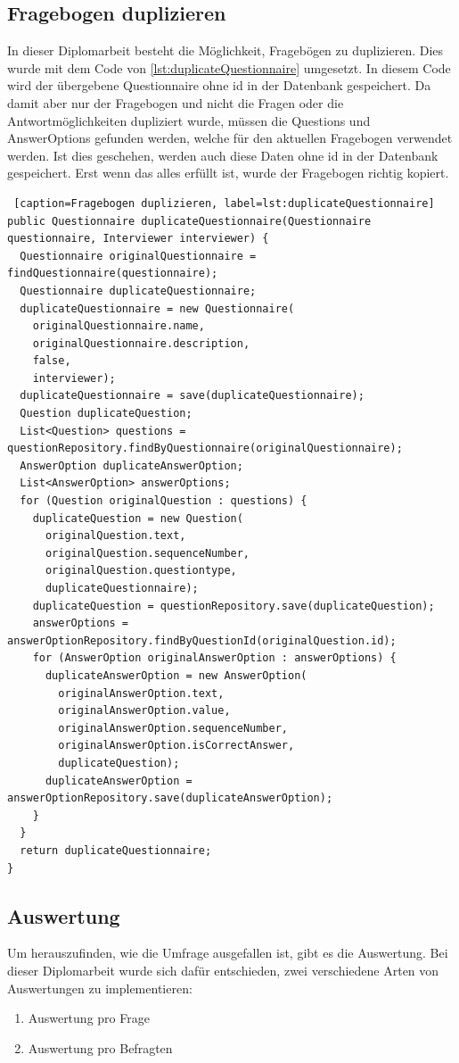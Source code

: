 \subsection{Fragebogen duplizieren}
In dieser Diplomarbeit besteht die Möglichkeit, Fragebögen zu duplizieren. Dies wurde mit dem Code von
\ref{lst:duplicateQuestionnaire} umgesetzt. In diesem Code wird der übergebene Questionnaire ohne id in der Datenbank
gespeichert. Da damit aber nur der Fragebogen und nicht die Fragen oder die Antwortmöglichkeiten dupliziert wurde,
müssen die Questions und AnswerOptions gefunden werden, welche für den aktuellen Fragebogen verwendet werden.
Ist dies geschehen, werden auch diese Daten ohne id in der Datenbank gespeichert. Erst wenn das alles erfüllt ist,
wurde der Fragebogen richtig kopiert.
\begin{lstlisting} [caption=Fragebogen duplizieren, label=lst:duplicateQuestionnaire]
public Questionnaire duplicateQuestionnaire(Questionnaire questionnaire, Interviewer interviewer) {
  Questionnaire originalQuestionnaire = findQuestionnaire(questionnaire);
  Questionnaire duplicateQuestionnaire;
  duplicateQuestionnaire = new Questionnaire(
    originalQuestionnaire.name,
    originalQuestionnaire.description,
    false,
    interviewer);
  duplicateQuestionnaire = save(duplicateQuestionnaire);
  Question duplicateQuestion;
  List<Question> questions = questionRepository.findByQuestionnaire(originalQuestionnaire);
  AnswerOption duplicateAnswerOption;
  List<AnswerOption> answerOptions;
  for (Question originalQuestion : questions) {
    duplicateQuestion = new Question(
      originalQuestion.text,
      originalQuestion.sequenceNumber,
      originalQuestion.questiontype,
      duplicateQuestionnaire);
    duplicateQuestion = questionRepository.save(duplicateQuestion);
    answerOptions = answerOptionRepository.findByQuestionId(originalQuestion.id);
    for (AnswerOption originalAnswerOption : answerOptions) {
      duplicateAnswerOption = new AnswerOption(
        originalAnswerOption.text,
        originalAnswerOption.value,
        originalAnswerOption.sequenceNumber,
        originalAnswerOption.isCorrectAnswer,
        duplicateQuestion);
      duplicateAnswerOption = answerOptionRepository.save(duplicateAnswerOption);
    }
  }
  return duplicateQuestionnaire;
}
\end{lstlisting}

\subsection{Auswertung}
Um herauszufinden, wie die Umfrage ausgefallen ist, gibt es die Auswertung. Bei dieser Diplomarbeit wurde sich dafür
entschieden, zwei verschiedene Arten von Auswertungen zu implementieren:
\begin{enumerate}
  \item Auswertung pro Frage
  \item Auswertung pro Befragten
\end{enumerate}
